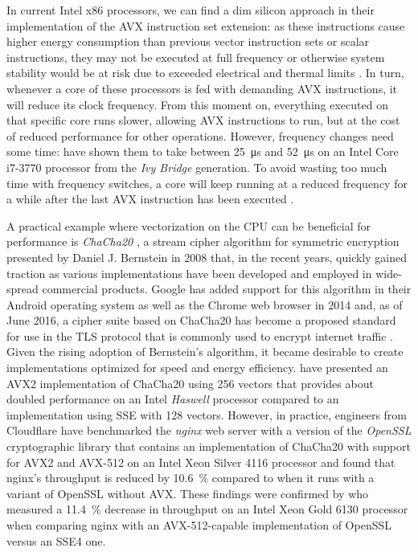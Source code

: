In current Intel \gls{x86} processors, we can find a dim silicon approach in their implementation of the \gls{AVX} instruction set extension: as these instructions cause higher energy consumption than previous vector instruction sets or scalar instructions, they may not be executed at full frequency or otherwise system stability would be at risk due to exceeded electrical and thermal limits \cite{inteloptimizationmanual}. In turn, whenever a core of these processors is fed with demanding \gls{AVX} instructions, it will reduce its clock frequency. From this moment on, everything executed on that specific core runs slower, allowing \gls{AVX} instructions to run, but at the cost of reduced performance for other operations. However, frequency changes need some time: \citeauthor{mazouz2014evaluation} \cite{mazouz2014evaluation} have shown them to take between \SI{25}{\micro\second} and \SI{52}{\micro\second} on an Intel Core i7-3770 processor from the \textit{Ivy Bridge} generation. To avoid wasting too much time with frequency switches, a core will keep running at a reduced frequency for a while after the last \gls{AVX} instruction has been executed \cite{inteloptimizationmanual}.

A practical example where vectorization on the \gls{CPU} can be beneficial for performance is \emph{ChaCha20} \cite{bernstein2008chacha}, a stream cipher algorithm for symmetric encryption presented by Daniel J. Bernstein in 2008 that, in the recent years, quickly gained traction as various implementations have been developed and employed in wide-spread commercial products. Google has added support for this algorithm in their Android operating system as well as the Chrome web browser in 2014 \cite{googlechacha20} and, as of June 2016, a cipher suite based on ChaCha20 has become a proposed standard for use in the \gls{TLS} protocol that is commonly used to encrypt internet traffic \cite{rfc7905}. Given the rising adoption of Bernstein's algorithm, it became desirable to create implementations optimized for speed and energy efficiency. \citeauthor{goll2014vectorization} \cite{goll2014vectorization} have presented an \gls{AVX2} implementation of ChaCha20 using \SI[number-unit-product=-]{256}{\bit} vectors that provides about doubled performance on an Intel \textit{Haswell} processor compared to an implementation using \gls{SSE} with \SI[number-unit-product=-]{128}{\bit} vectors. However, in practice, engineers from Cloudflare \cite{cloudflareinteldangers} have benchmarked the \emph{nginx} web server with a version of the \emph{OpenSSL} cryptographic library that contains an implementation of ChaCha20 with support for \gls{AVX2} and \gls{AVX-512} on an Intel Xeon Silver 4116 processor and found that nginx's throughput is reduced by \SI{10.6}{\percent} compared to when it runs with a variant of OpenSSL without \gls{AVX}. These findings were confirmed by \citeauthor{gottschlag19sfma} \cite{gottschlag19sfma} who measured a \SI{11.4}{\percent} decrease in throughput on an Intel Xeon Gold 6130 processor when comparing nginx with an \gls{AVX-512}-capable implementation of OpenSSL versus an \gls{SSE}4 one.

